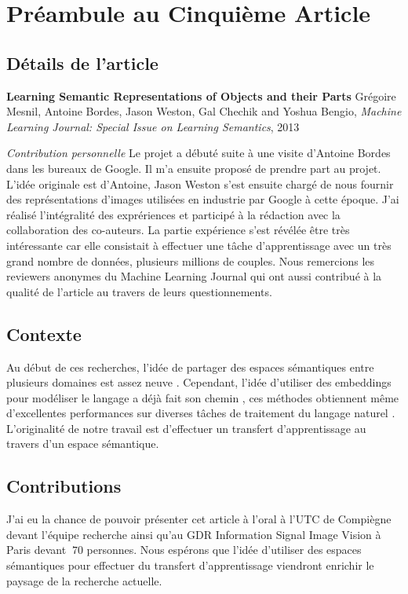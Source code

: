 \chapter{Pr\'{e}ambule au Cinqui\`{e}me Article }

\section{D\'{e}tails de l'article}

{\bf Learning Semantic Representations of Objects and their Parts} Grégoire
Mesnil, Antoine Bordes, Jason Weston, Gal Chechik and Yoshua Bengio, {\it
Machine Learning Journal: Special Issue on Learning Semantics}, 2013

{\it Contribution personnelle} Le projet a débuté suite à une visite d'Antoine
Bordes dans les bureaux de Google. Il m'a ensuite proposé de prendre part au
projet. L'idée originale est d'Antoine, Jason Weston s'est ensuite chargé de
nous fournir des représentations d'images utilisées en industrie par Google à
cette époque. J'ai réalisé l'intégralité des exprériences et participé à la
rédaction avec la collaboration des co-auteurs. La partie expérience s'est
révélée être très intéressante car elle consistait à effectuer une tâche
d'apprentissage avec un très grand nombre de données, plusieurs millions de
couples.  Nous remercions les reviewers anonymes du Machine Learning Journal
qui ont aussi contribué à la qualité de l'article au travers de leurs
questionnements.

\section{Contexte}

Au début de ces recherches, l'idée de partager des espaces sémantiques entre
plusieurs domaines est assez neuve \citep{image-wsabie}. Cependant, l'idée
d'utiliser des embeddings pour modéliser le langage a déjà fait son chemin
\citep{bengio:2003}, ces méthodes obtiennent même d'excellentes performances
sur diverses tâches de traitement du langage naturel \citep{collobert:2011b}.
L'originalité de notre travail est d'effectuer un transfert d'apprentissage au
travers d'un espace sémantique.

\section{Contributions}

J'ai eu la chance de pouvoir présenter cet article à l'oral à l'UTC de
Compiègne devant l'équipe recherche ainsi qu'au GDR Information Signal Image
Vision à Paris devant $~70$ personnes. Nous espérons que l'idée d'utiliser des
espaces sémantiques pour effectuer du transfert d'apprentissage viendront
enrichir le paysage de la recherche actuelle.

